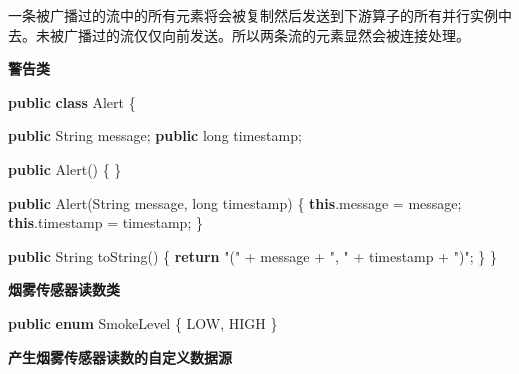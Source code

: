 \documentclass[cn,11pt,chinese]{elegantbook}
\newenvironment{Shaded}{}{}
\newcommand{\BuiltInTok}[1]{#1}
\newcommand{\DataTypeTok}[1]{\textcolor[rgb]{0.56,0.13,0.00}{#1}}
\newcommand{\FunctionTok}[1]{\textcolor[rgb]{0.02,0.16,0.49}{#1}}
\newcommand{\KeywordTok}[1]{\textcolor[rgb]{0.00,0.44,0.13}{\textbf{#1}}}
\newcommand{\NormalTok}[1]{#1}
\newcommand{\StringTok}[1]{\textcolor[rgb]{0.25,0.44,0.63}{#1}}
\begin{document}
一条被广播过的流中的所有元素将会被复制然后发送到下游算子的所有并行实例中去。未被广播过的流仅仅向前发送。所以两条流的元素显然会被连接处理。

\textbf{警告类}

\begin{Shaded}
\begin{Highlighting}[]
\KeywordTok{public} \KeywordTok{class}\NormalTok{ Alert \{}

    \KeywordTok{public} \BuiltInTok{String}\NormalTok{ message;}
    \KeywordTok{public} \DataTypeTok{long}\NormalTok{ timestamp;}

    \KeywordTok{public} \FunctionTok{Alert}\NormalTok{() \{ \}}

    \KeywordTok{public} \FunctionTok{Alert}\NormalTok{(}\BuiltInTok{String}\NormalTok{ message, }\DataTypeTok{long}\NormalTok{ timestamp) \{}
        \KeywordTok{this}\NormalTok{.}\FunctionTok{message}\NormalTok{ = message;}
        \KeywordTok{this}\NormalTok{.}\FunctionTok{timestamp}\NormalTok{ = timestamp;}
\NormalTok{    \}}

    \KeywordTok{public} \BuiltInTok{String} \FunctionTok{toString}\NormalTok{() \{}
        \KeywordTok{return} \StringTok{"("}\NormalTok{ + message + }\StringTok{", "}\NormalTok{ + timestamp + }\StringTok{")"}\NormalTok{;}
\NormalTok{    \}}
\NormalTok{\}}
\end{Highlighting}
\end{Shaded}

\textbf{烟雾传感器读数类}

\begin{Shaded}
\begin{Highlighting}[]
\KeywordTok{public} \KeywordTok{enum}\NormalTok{ SmokeLevel \{}
\NormalTok{    LOW,}
\NormalTok{    HIGH}
\NormalTok{\}}
\end{Highlighting}
\end{Shaded}

\textbf{产生烟雾传感器读数的自定义数据源}
\end{document}
